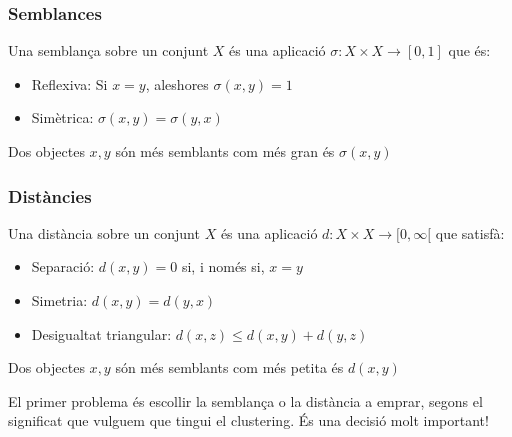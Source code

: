 \documentclass[12pt,t]{beamer}
\renewcommand{\emph}[1]{{\color{red}#1}}
\renewcommand{\leq}{\leqslant}
\theoremstyle{plain}
\theoremstyle{definition}
\begin{document}
\begin{frame}
\frametitle{Semblances}

Una \emph{semblança} sobre un conjunt $X$ és una aplicació $\sigma:X\times X\to [0,1]$ que és:
\begin{itemize}
\item \emph{Reflexiva}: Si $x=y$, aleshores $\sigma(x,y)=1$
\medskip

\item \emph{Simètrica}: $\sigma(x,y)=\sigma(y,x)$
\end{itemize}
\medskip

Dos objectes $x,y$ són més semblants com més gran és $\sigma(x,y)$
\end{frame}



\begin{frame}
\frametitle{Distàncies}

Una \emph{distància} sobre un conjunt $X$ és una aplicació $d:X\times X\to [0,\infty[$ que satisfà:
\begin{itemize}
\item \emph{Separació}: $d(x,y)=0$ si, i només si, $x=y$
\medskip

\item \emph{Simetria}: $d(x,y)=d(y,x)$
\medskip

\item \emph{Desigualtat triangular}: $d(x,z)\leq d(x,y)+d(y,z)$
\end{itemize}
\medskip

Dos objectes $x,y$ són més semblants com més petita és $d(x,y)$
\bigskip


El primer problema és escollir la semblança o la distància a emprar, segons el significat que vulguem que tingui el clustering. \emph{És una decisió molt  important!}
\end{frame}
\end{document}
